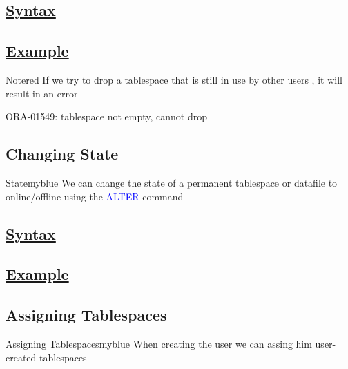 \vspace{0.15cm}
\subsection*{\underline{Syntax}}


\vspace{0.15cm}
\subsection*{\underline{Example}}


\vspace{0.15cm}
\begin{prettyBox}{Note}{red}
If we try to drop a tablespace that is still in use by other users , it will result in an error
\begin{center}
ORA-01549: tablespace not empty, cannot drop
\end{center}
\end{prettyBox}

\vspace{0.25cm}

\subsection{Changing State}
\begin{prettyBox}{State}{myblue}
We can change the state of a permanent tablespace or datafile to online/offline using the 
\textcolor{blue}{ALTER} command
\end{prettyBox}

\vspace{0.15cm}

\subsection*{\underline{Syntax}}


\vspace{0.15cm}
\subsection*{\underline{Example}}


\vspace{0.25cm}

\subsection{Assigning Tablespaces}
\begin{prettyBox}{Assigning Tablespaces}{myblue}
When creating the user we can assing him user-created tablespaces
\end{prettyBox}

